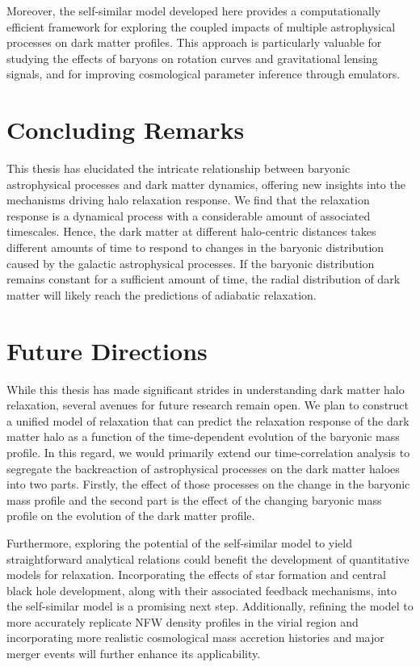 Moreover, the self-similar model developed here provides a computationally efficient framework for exploring the coupled impacts of multiple astrophysical processes on dark matter profiles. This approach is particularly valuable for studying the effects of baryons on rotation curves and gravitational lensing signals, and for improving cosmological parameter inference through emulators.

\section{Concluding Remarks}
This thesis has elucidated the intricate relationship between baryonic astrophysical processes and dark matter dynamics, offering new insights into the mechanisms driving halo relaxation response. We find that the relaxation response is a dynamical process with a considerable amount of associated timescales. Hence, the dark matter at different halo-centric distances takes different amounts of time to respond to changes in the baryonic distribution caused by the galactic astrophysical processes. If the baryonic distribution remains constant for a sufficient amount of time, the radial distribution of dark matter will likely reach the predictions of adiabatic relaxation.

\section{Future Directions}
While this thesis has made significant strides in understanding dark matter halo relaxation, several avenues for future research remain open. We plan to construct a unified model of relaxation that can predict the relaxation response of the dark matter halo as a function of the time-dependent evolution of the baryonic mass profile. In this regard, we would primarily extend our time-correlation analysis to segregate the backreaction of astrophysical processes on the dark matter haloes into two parts. Firstly, the effect of those processes on the change in the baryonic mass profile and the second part is the effect of the changing baryonic mass profile on the evolution of the dark matter profile.

Furthermore, exploring the potential of the self-similar model to yield straightforward analytical relations could benefit the development of quantitative models for relaxation. Incorporating the effects of star formation and central black hole development, along with their associated feedback mechanisms, into the self-similar model is a promising next step. Additionally, refining the model to more accurately replicate NFW density profiles in the virial region and incorporating more realistic cosmological mass accretion histories and major merger events will further enhance its applicability.
